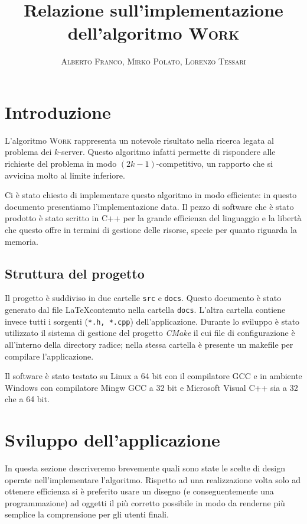\documentclass[a4paper, 10pt]{article}
\begin{document}
    \title{Relazione sull'implementazione dell'algoritmo \textsc{Work}}
    \author{\textsc{Alberto Franco, Mirko Polato, Lorenzo Tessari}}
    \maketitle

\section{Introduzione}    
L'algoritmo \textsc{Work} rappresenta un notevole risultato nella ricerca
legata al problema dei $k$-server. Questo algoritmo infatti permette di 
rispondere alle richieste del problema in modo $(2k - 1)$-competitivo, un rapporto che si avvicina molto al limite inferiore.

Ci è stato chiesto di implementare questo algoritmo in modo efficiente: in 
questo documento presentiamo l'implementazione data. Il pezzo di software che 
è stato prodotto è stato scritto in C++ per la grande efficienza del 
linguaggio e la libertà che questo offre in termini di gestione delle risorse,
 specie per quanto riguarda la memoria.

\subsection{Struttura del progetto}
Il progetto è suddiviso in due cartelle \texttt{src} e \texttt{docs}. Questo documento è stato generato dal file \LaTeX contenuto nella cartella \texttt{docs}. L'altra cartella contiene invece tutti i sorgenti (\texttt{*.h, *.cpp}) dell'applicazione.
Durante lo sviluppo è stato utilizzato il sistema di gestione del progetto \emph{CMake} il cui file di configurazione è all'interno della directory radice; nella stessa cartella è presente un makefile per compilare l'applicazione.

Il software è stato testato su Linux a 64 bit con il compilatore GCC e in 
ambiente Windows con compilatore Mingw GCC a 32 bit e Microsoft Visual C++
sia a 32 che a 64 bit.

\section{Sviluppo dell'applicazione}
In questa sezione descriveremo brevemente quali sono state le scelte di design
operate nell'implementare l'algoritmo. Rispetto ad una realizzazione volta
solo ad ottenere efficienza si è preferito usare un disegno (e conseguentemente
una programmazione) ad oggetti il più corretto possibile in modo da renderne più semplice la comprensione per gli utenti finali.
\end{document}
